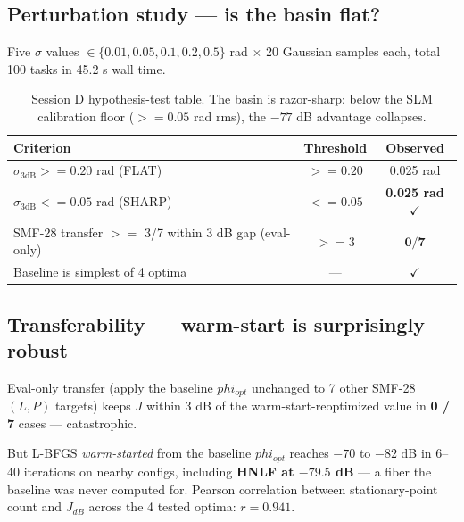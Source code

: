 \documentclass[11pt,letterpaper]{article}
\def\varphi{phi}%
\def\mathrm#1{#1}%
\def\geq{>=}%
\def\leq{<=}%
\begin{document}
\subsection{Perturbation study --- is the basin flat?}

Five $\sigma$ values $\in \{0.01, 0.05, 0.1, 0.2, 0.5\}$ rad $\times$ 20 Gaussian samples each, total 100 tasks in 45.2 s wall time.

\begin{table}[H]
\centering
\small
\begin{tabular}{>{\raggedright\arraybackslash}p{8cm}cc}
\toprule
Criterion & Threshold & Observed \\
\midrule
$\sigma_{3\text{dB}} \geq 0.20$ rad (FLAT)               & $\geq 0.20$ & 0.025 rad \\
$\sigma_{3\text{dB}} \leq 0.05$ rad (SHARP)              & $\leq 0.05$ & \textbf{0.025 rad} $\checkmark$ \\
SMF-28 transfer $\geq$ 3/7 within 3 dB gap (eval-only)   & $\geq 3$    & $\mathbf{0/7}$ \\
Baseline is simplest of 4 optima                         & ---         & $\checkmark$ \\
\bottomrule
\end{tabular}
\caption{Session D hypothesis-test table. The basin is razor-sharp: below the SLM calibration floor ($\geq 0.05$ rad rms), the $-77$ dB advantage collapses.}
\end{table}

\subsection{Transferability --- warm-start is surprisingly robust}

Eval-only transfer (apply the baseline $\varphi_{\mathrm{opt}}$ unchanged to 7 other SMF-28 $(L,P)$ targets) keeps $J$ within 3 dB of the warm-start-reoptimized value in \textbf{0 / 7} cases --- catastrophic.

But L-BFGS \emph{warm-started} from the baseline $\varphi_{\mathrm{opt}}$ reaches $-70$ to $-82$ dB in 6--40 iterations on nearby configs, including \textbf{HNLF at $-79.5$ dB} --- a fiber the baseline was never computed for. Pearson correlation between stationary-point count and $J_{\mathrm{dB}}$ across the 4 tested optima: $r = 0.941$.
\end{document}
